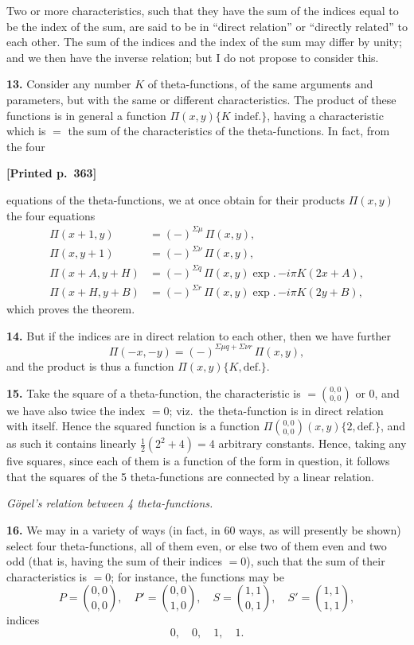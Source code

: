 \documentclass[11pt]{article}
\begin{document}
Two or more characteristics, such that they have the sum of the indices equal to be the index of the sum, are said to be in ``direct relation'' or ``directly related'' to each other. The sum of the indices and the index of the sum may differ by unity; and we then have the inverse relation; but I do not propose to consider this.

\medskip
\noindent\textbf{13.} Consider any number $K$ of theta-functions, of the same arguments and parameters, but with the same or different characteristics. The product of these functions is in general a function $\Pi(x,y)\{K\text{ indef.}\}$, having a characteristic which is $=$ the sum of the characteristics of the theta-functions. In fact, from the four

\medskip
\noindent\textbf{[Printed p.~363]}\hfill

equations of the theta-functions, we at once obtain for their products $\Pi(x,y)$ the four equations
\begin{align*}
\Pi(x+1,y) &= (-)^{\Sigma\mu}\,\Pi(x,y),\\
\Pi(x,y+1) &= (-)^{\Sigma\nu}\,\Pi(x,y),\\
\Pi(x+A,y+H) &= (-)^{\Sigma q}\,\Pi(x,y)\exp.\,{-i\pi K}(2x+A),\\
\Pi(x+H,y+B) &= (-)^{\Sigma r}\,\Pi(x,y)\exp.\,{-i\pi K}(2y+B),
\end{align*}
which proves the theorem.

\medskip
\noindent\textbf{14.} But if the indices are in direct relation to each other, then we have further
\[
\Pi(-x,-y) = (-)^{\Sigma\mu q+\Sigma\nu r}\,\Pi(x,y),
\]
and the product is thus a function $\Pi(x,y)\{K,\text{def.}\}$.

\medskip
\noindent\textbf{15.} Take the square of a theta-function, the characteristic is $=\binom{0,0}{0,0}$ or 0, and we have also twice the index $=0$; viz.\ the theta-function is in direct relation with itself. Hence the squared function is a function $\Pi\binom{0,0}{0,0}(x,y)\{2,\text{def.}\}$, and as such it contains linearly $\tfrac{1}{2}(2^{2}+4)=4$ arbitrary constants. Hence, taking any five squares, since each of them is a function of the form in question, it follows that the squares of the 5 theta-functions are connected by a linear relation.

\medskip
\begin{center}\textit{G\"opel's relation between 4 theta-functions.}\end{center}

\noindent\textbf{16.} We may in a variety of ways (in fact, in 60 ways, as will presently be shown) select four theta-functions, all of them even, or else two of them even and two odd (that is, having the sum of their indices $=0$), such that the sum of their characteristics is $=0$; for instance, the functions may be
\[
P=\binom{0,0}{0,0},\quad P'=\binom{0,0}{1,0},\quad S=\binom{1,1}{0,1},\quad S'=\binom{1,1}{1,1},
\]
indices
\[
0,\quad 0,\quad 1,\quad 1.
\]
\end{document}
